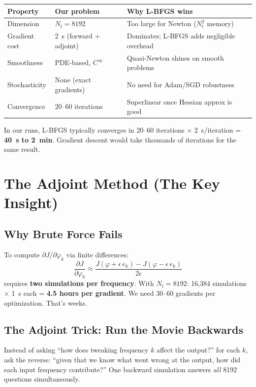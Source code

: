 \documentclass[12pt,a4paper]{article}
\newcommand{\pdv}[2]{\frac{\partial #1}{\partial #2}}
\begin{document}
\begin{center}
\begin{tabular}{lll}
\toprule
\textbf{Property} & \textbf{Our problem} & \textbf{Why L-BFGS wins} \\
\midrule
Dimension & $N_t = 8192$ & Too large for Newton ($N_t^2$ memory) \\
Gradient cost & 2~s (forward + adjoint) & Dominates; L-BFGS adds negligible overhead \\
Smoothness & PDE-based, $C^\infty$ & Quasi-Newton shines on smooth problems \\
Stochasticity & None (exact gradients) & No need for Adam/SGD robustness \\
Convergence & 20--60 iterations & Superlinear once Hessian approx is good \\
\bottomrule
\end{tabular}
\end{center}

In our runs, L-BFGS typically converges in 20--60 iterations $\times$ 2~s/iteration = \textbf{40~s to 2~min}. Gradient descent would take thousands of iterations for the same result.


\section{The Adjoint Method (The Key Insight)}

\subsection{Why Brute Force Fails}

To compute $\partial J/\partial\varphi_k$ via finite differences:
\begin{equation}
\pdv{J}{\varphi_k} \approx \frac{J(\varphi + \epsilon\,e_k) - J(\varphi - \epsilon\,e_k)}{2\epsilon}
\end{equation}
requires \textbf{two simulations per frequency}. With $N_t = 8192$: 16,384 simulations $\times$ 1~s each = \textbf{4.5 hours per gradient}. We need 30--60 gradients per optimization. That's weeks.

\subsection{The Adjoint Trick: Run the Movie Backwards}

\begin{intuition}
Instead of asking ``how does tweaking frequency $k$ affect the output?'' for each $k$, ask the reverse: ``given that we know what went wrong at the output, how did each input frequency contribute?'' One backward simulation answers \emph{all} 8192 questions simultaneously.
\end{intuition}
\end{document}
